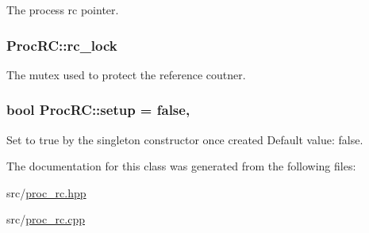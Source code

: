 The process rc pointer. 

\subsubsection[{\texorpdfstring{rc\+\_\+lock}{rc_lock}}]{ Proc\+R\+C\+::rc\+\_\+lock\hspace{0.3cm}{\ttfamily [private]}}\hypertarget{class_proc_r_c_a37de2551af458d21bdb7291ba02fabb4}{}\label{class_proc_r_c_a37de2551af458d21bdb7291ba02fabb4}


The mutex used to protect the reference coutner. 

\subsubsection[{\texorpdfstring{setup}{setup}}]{\setlength{\rightskip}{0pt plus 5cm}bool Proc\+R\+C\+::setup = false\hspace{0.3cm}{\ttfamily [static]}, {\ttfamily [private]}}\hypertarget{class_proc_r_c_acccb74d8597ab4b0041ba32ea64ea06d}{}\label{class_proc_r_c_acccb74d8597ab4b0041ba32ea64ea06d}


Set to true by the singleton constructor once created Default value\+: false. 



The documentation for this class was generated from the following files\+:\begin{DoxyCompactItemize}
\item 
src/\hyperlink{proc__rc_8hpp}{proc\+\_\+rc.\+hpp}\item 
src/\hyperlink{proc__rc_8cpp}{proc\+\_\+rc.\+cpp}\end{DoxyCompactItemize}
